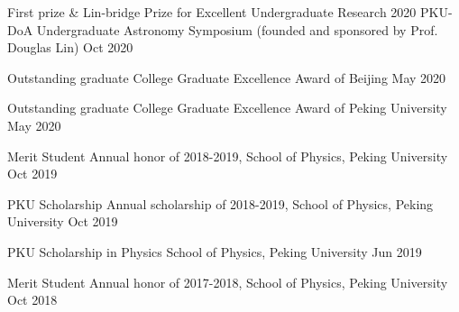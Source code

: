 




\begin{cvhonors}

\cvhonor
{First prize \& Lin-bridge Prize for Excellent Undergraduate Research} %
{2020 PKU-DoA Undergraduate Astronomy Symposium (founded and sponsored by Prof. Douglas Lin)} %
{Oct 2020} %

\cvhonor
{Outstanding graduate} %
{College Graduate Excellence Award of Beijing} %
{May 2020} %

\cvhonor
{Outstanding graduate} %
{College Graduate Excellence Award of Peking University} %
{May 2020} %

\cvhonor
{Merit Student} %
{Annual honor of 2018-2019, School of Physics, Peking University} %
{Oct 2019} %


\cvhonor
{PKU Scholarship} %
{Annual scholarship of 2018-2019, School of Physics, Peking University} %
{Oct 2019} %

\cvhonor
{PKU Scholarship in Physics} %
{School of Physics, Peking University} %
{Jun 2019} %




\cvhonor
{Merit Student} %
{Annual honor of 2017-2018, School of Physics, Peking University} %
{Oct 2018} %


\end{cvhonors}
